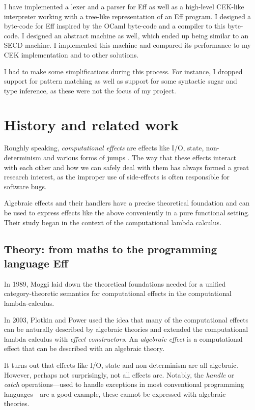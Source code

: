 \documentclass[class=article,crop=false,11pt]{standalone}
\begin{document}
I have implemented a lexer and a parser for Eff as well as a high-level
CEK-like interpreter working with a tree-like representation of an Eff program.
I designed a byte-code for Eff inspired by the OCaml byte-code and a compiler
to this byte-code. I designed an abstract machine as well, which ended up being
similar to an SECD machine. I implemented this machine and compared its
performance to my CEK implementation and to other solutions.

I had to make some simplifications during this process. For instance, I dropped
support for pattern matching as well as support for some syntactic sugar and
type inference, as these were not the focus of my project.

\section{History and related work}

Roughly speaking, \emph{computational effects} are effects like I/O, state,
non-determinism and  various forms of jumps \cite{plotkin2002computational}.
The way that these effects interact with each other and how we can safely deal
with them has always formed a great research interest, as the improper use of
side-effects is often responsible for software bugs.

Algebraic effects and their handlers have a precise theoretical foundation and
can be used to express effects like the above conveniently in a pure
functional setting. Their study began in the context of the computational
lambda calculus.

\subsection{Theory: from maths to the programming language Eff}

In 1989, Moggi \cite{moggi1989computational,moggi1990abstract} laid down the
theoretical foundations needed for a unified category-theoretic semantics for
computational effects in the computational lambda-calculus.

In 2003, Plotkin and Power \cite{plotkin2003algebraic} used the idea that many
of the computational effects can be naturally described by algebraic theories
and extended the computational lambda calculus with \emph{effect constructors}.
An \emph{algebraic effect} is a computational effect that can be described
with an algebraic theory.

It turns out that effects like I/O, state and non-determinism are all algebraic.
However, perhaps not surprisingly, not all effects are. Notably, the
\emph{handle} or \emph{catch} operations---used to handle exceptions in
most conventional programming languages---are a good example, these cannot be
expressed with algebraic theories.
\end{document}
